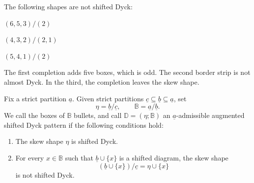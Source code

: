 \documentclass[12pt]{amsart}
\renewcommand{\a}{\underline{a}}
\renewcommand{\b}{\underline{b}}
\newcommand{\DD}{\mathbb{D}}
\newcommand{\defi}[1]{{\upshape\sffamily #1}}
\theoremstyle{definition}
\numberwithin{equation}{section}
\begin{document}
\medskip

\noindent The following shapes are not shifted Dyck:\\

\begin{center}
\begin{minipage}[b]{.30\textwidth}
\centering
{}
\par\smallskip $(6,5,3)/(2)$
\end{minipage}
\hfill
\begin{minipage}[b]{.30\textwidth}
\centering
{}
\par\smallskip $(4,3,2)/(2,1)$
\end{minipage}
\hfill
\begin{minipage}[b]{.30\textwidth}
\centering
{}
\par\smallskip $(5,4,1)/(2)$
\end{minipage}
\end{center}

\medskip

\noindent The first completion adds five boxes, which is odd. The second border strip
is not almost Dyck. In the third, the completion leaves the skew shape.
\endgroup


Fix a strict partition $\a$. Given strict partitions
$\underline c\subseteq\b\subseteq\a$, set
\begin{equation}
 \eta=\b/\underline c,\qquad \mathbb B=\a/\b.
\end{equation}
We call the boxes of $\mathbb B$ \defi{bullets}, and call
$\DD=(\eta;\mathbb B)$ an \defi{$\a$-admissible augmented shifted
Dyck pattern} if the following conditions hold:
\begin{enumerate}
\item The skew shape $\eta$ is shifted Dyck.
\item For every $x\in\mathbb B$ such that $\b\cup\{x\}$ is a
shifted diagram, the skew shape
\begin{equation}\label{eq:sh-bullet-condition}
 (\b\cup\{x\})/\underline c=\eta\cup\{x\}
\end{equation}
is not shifted Dyck.
\end{enumerate}
\end{document}
